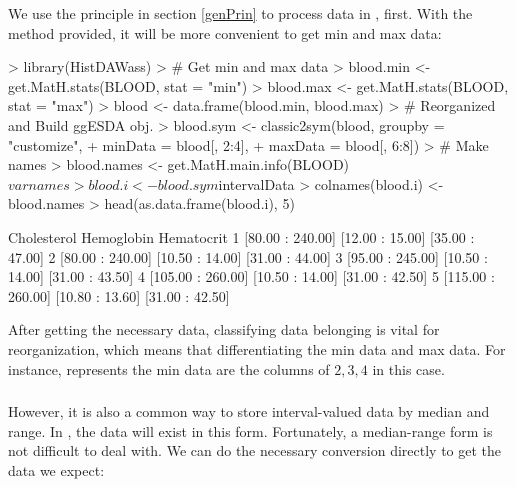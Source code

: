 \documentclass[article]{jss}
\begin{document}
We use the principle in section \ref{genPrin} to process  data in , first. With the method  provided, it will be more convenient to get min and max data:

\begin{Schunk}
\begin{Sinput}
> library(HistDAWass)
> # Get min and max data
> blood.min <- get.MatH.stats(BLOOD, stat = "min")
> blood.max <- get.MatH.stats(BLOOD, stat = "max")
> blood <- data.frame(blood.min, blood.max)
> # Reorganized and Build ggESDA obj.
> blood.sym <- classic2sym(blood, groupby = "customize",
+                      minData = blood[, 2:4],
+                      maxData = blood[, 6:8])
> # Make names
> blood.names <- get.MatH.main.info(BLOOD)$varnames
> blood.i <- blood.sym$intervalData
> colnames(blood.i) <- blood.names
> head(as.data.frame(blood.i), 5)
\end{Sinput}
\begin{Soutput}
        Cholesterol      Hemoglobin      Hematocrit
1  [80.00 : 240.00] [12.00 : 15.00] [35.00 : 47.00]
2  [80.00 : 240.00] [10.50 : 14.00] [31.00 : 44.00]
3  [95.00 : 245.00] [10.50 : 14.00] [31.00 : 43.50]
4 [105.00 : 260.00] [10.50 : 14.00] [31.00 : 42.50]
5 [115.00 : 260.00] [10.80 : 13.60] [31.00 : 42.50]
\end{Soutput}
\end{Schunk}

After getting the necessary data, classifying data belonging is vital for reorganization, which means that differentiating the min data and max data. For instance,  represents the min data are the columns of $2,3,4$ in this case.

\subsubsection[MAINT.Data]{}

However, it is also a common way to store interval-valued data by median and range. In , the data will exist in this form. Fortunately, a median-range form is not difficult to deal with. We can do the necessary conversion directly to get the data we expect:
\end{document}
